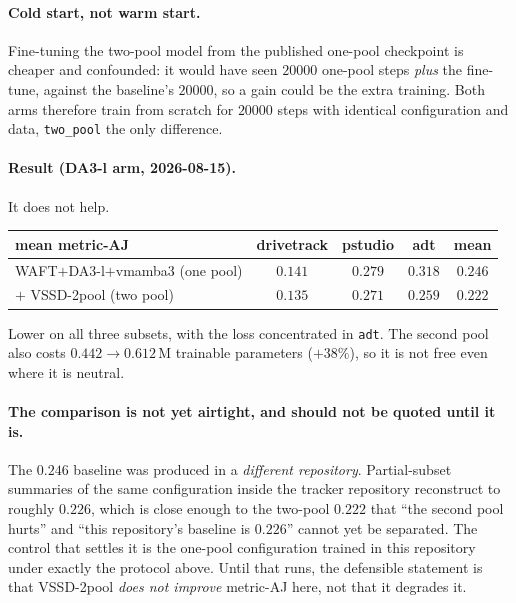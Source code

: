 \documentclass[11pt,a4paper]{article}
\begin{document}
\paragraph{Cold start, not warm start.} Fine-tuning the two-pool model from the published
one-pool checkpoint is cheaper and confounded: it would have seen $20000$ one-pool steps
\emph{plus} the fine-tune, against the baseline's $20000$, so a gain could be the extra training.
Both arms therefore train from scratch for $20000$ steps with identical configuration and data,
\texttt{two\_pool} the only difference.

\paragraph{Result (DA3-l arm, 2026-08-15).} It does not help.

\begin{center}
\begin{tabular}{lcccc}
\toprule
mean metric-AJ & drivetrack & pstudio & adt & mean \\
\midrule
WAFT$+$DA3-l$+$vmamba3 (one pool) & $0.141$ & $0.279$ & $0.318$ & $0.246$ \\
$+$ VSSD-2pool (two pool) & $0.135$ & $0.271$ & $0.259$ & $0.222$ \\
\bottomrule
\end{tabular}
\end{center}

\noindent Lower on all three subsets, with the loss concentrated in \texttt{adt}. The second pool
also costs $0.442 \to 0.612$\,M trainable parameters ($+38\%$), so it is not free even where it is
neutral.

\paragraph{The comparison is not yet airtight, and should not be quoted until it is.} The $0.246$
baseline was produced in a \emph{different repository}. Partial-subset summaries of the same
configuration inside the tracker repository reconstruct to roughly $0.226$, which is close enough
to the two-pool $0.222$ that ``the second pool hurts'' and ``this repository's baseline is
$0.226$'' cannot yet be separated. The control that settles it is the one-pool configuration
trained in this repository under exactly the protocol above. Until that runs, the defensible
statement is that VSSD-2pool \emph{does not improve} metric-AJ here, not that it degrades
it.
\end{document}
